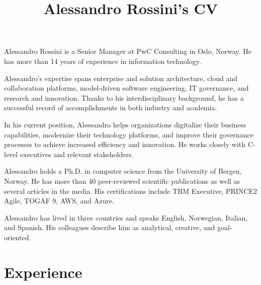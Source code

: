 \documentclass[a4paper,online]{adcv}
\title{Alessandro Rossini’s CV}
\begin{document}
Alessandro Rossini is a Senior Manager at PwC Consulting in Oslo, Norway. He has more than 14 years of experience in information technology.

Alessandro’s expertise spans enterprise and solution architecture, cloud and collaboration platforms, model-driven software engineering, IT governance, and research and innovation. Thanks to his interdisciplinary background, he has a successful record of accomplishments in both industry and academia.

In his current position, Alessandro helps organizations digitalize their business capabilities, modernize their technology platforms, and improve their governance processes to achieve increased efficiency and innovation. He works closely with C-level executives and relevant stakeholders.

Alessandro holds a Ph.D. in computer science from the University of Bergen, Norway. He has more than 40 peer-reviewed scientific publications as well as several articles in the media. His certifications include TBM Executive, PRINCE2 Agile, TOGAF 9, AWS, and Azure.

Alessandro has lived in three countries and speaks English, Norwegian, Italian, and Spanish. His colleagues describe him as analytical, creative, and goal-oriented.

\section{Experience}
\end{document}
